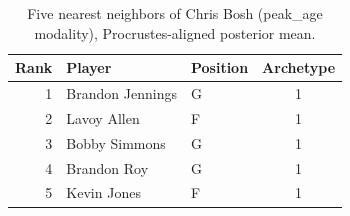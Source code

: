 \begin{table}[htbp]
  \centering\small
  \begin{tabular}{rllc}
    \toprule
    Rank & Player & Position & Archetype \\
    \midrule
    1 & Brandon Jennings & G & 1 \\
    2 & Lavoy Allen & F & 1 \\
    3 & Bobby Simmons & G & 1 \\
    4 & Brandon Roy & G & 1 \\
    5 & Kevin Jones & F & 1 \\
    \bottomrule
  \end{tabular}
  \caption{Five nearest neighbors of Chris Bosh (peak_age modality), Procrustes-aligned posterior mean.}
  \label{tab:Chris_Bosh_neighbors_peak_age}
\end{table}

